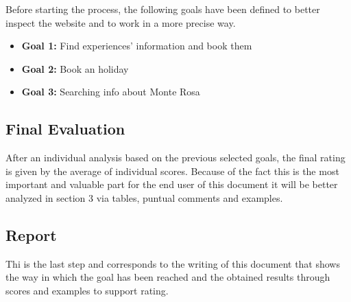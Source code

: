 Before starting the process, the following goals have been defined to better inspect the website and to work in a more precise way.
\begin{itemize}
	\item \textbf{Goal 1:} Find experiences' information and book them
	\item \textbf{Goal 2:} Book an holiday
	\item \textbf{Goal 3:} Searching info about Monte Rosa

\end{itemize}


\subsection{Final Evaluation}
After an individual analysis based on the previous selected goals, the final rating is given by the average  of individual scores. Because of the fact this is the most important and valuable part for the end user of this document it will be better analyzed in section 3 via tables, puntual comments and examples.


\subsection{Report}
Thi is the last step and corresponds to the writing of this document that shows the way in which the goal has been reached and the obtained results through scores and examples to support rating.